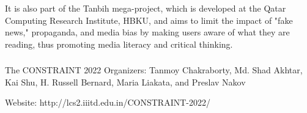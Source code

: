It is also part of the Tanbih mega-project, which is developed at the Qatar Computing Research Institute, HBKU, and aims to limit the impact of "fake news," propaganda, and media bias by making users aware of what they are reading, thus promoting media literacy and critical thinking.

\subsubsection{}
The CONSTRAINT 2022 Organizers:
Tanmoy Chakraborty, Md. Shad Akhtar, Kai Shu, H. Russell Bernard, Maria Liakata, and Preslav Nakov 

Website: 
http://lcs2.iiitd.edu.in/CONSTRAINT-2022/

